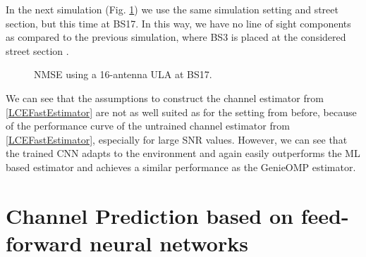 \documentclass[12pt, draftclsnofoot, onecolumn]{IEEEtran}
\begin{document}
In the next simulation (Fig. \ref{fig:NLOS}) we use the same simulation setting and street section, but this time at BS17. In this way, we have no line of sight components as compared to the previous simulation, where BS3 is placed at the considered street section \cite{Alkhateeb2019}.
\begin{figure}[t]
    \centering
\caption{NMSE using a 16-antenna ULA at BS17.}
\label{fig:NLOS}
\end{figure}
We can see that the assumptions to construct the channel estimator from \eqref{LCEFastEstimator} are not as well suited as for the setting from before, because of the performance curve of the untrained channel estimator from \eqref{LCEFastEstimator}, especially for large SNR values. However, we can see that the trained CNN adapts to the environment and again easily outperforms the ML based estimator and achieves a similar performance as the GenieOMP estimator.


\section{Channel Prediction based on feed-forward neural networks}
\label{sec:chmod}
\end{document}
